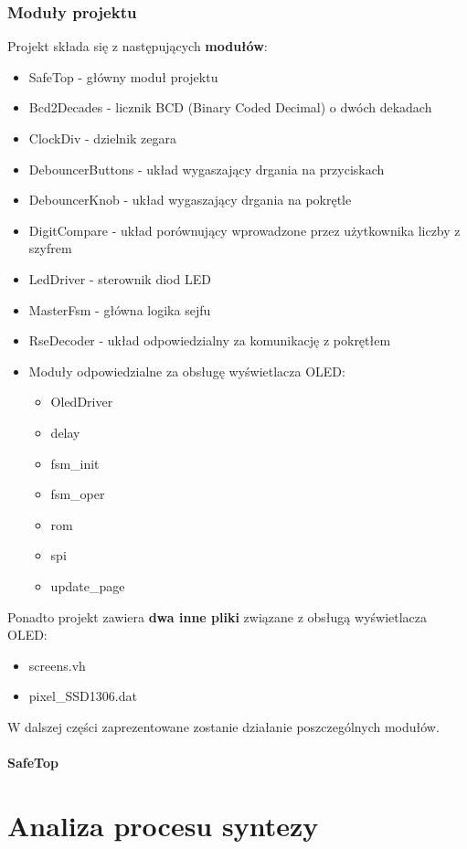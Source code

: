 \documentclass[12pt] {article}
\begin{document}
\subsubsection{Moduły projektu}
Projekt składa się z następujących \textbf{modułów}:
\begin{itemize}
\item SafeTop - główny moduł projektu
\item Bcd2Decades - licznik BCD (Binary Coded Decimal) o dwóch dekadach
\item ClockDiv - dzielnik zegara
\item DebouncerButtons - układ wygaszający drgania na przyciskach
\item DebouncerKnob - układ wygaszający drgania na pokrętle
\item DigitCompare - układ porównujący wprowadzone przez użytkownika liczby z szyfrem 
\item LedDriver - sterownik diod LED
\item MasterFsm - główna logika sejfu
\item RseDecoder - układ odpowiedzialny za komunikację z pokrętłem
\item Moduły odpowiedzialne za obsługę wyświetlacza OLED: 
\begin{itemize}
\item OledDriver
\item delay
\item fsm\_init
\item fsm\_oper
\item rom
\item spi
\item update\_page
\end{itemize}
\end{itemize}
Ponadto projekt zawiera \textbf{dwa inne pliki} związane z obsługą wyświetlacza OLED:
\begin{itemize}
\item screens.vh
\item pixel\_SSD1306.dat
\end{itemize}
W dalszej części zaprezentowane zostanie działanie poszczególnych modułów.

\paragraph{SafeTop}

\section{Analiza procesu syntezy}
\end{document}
